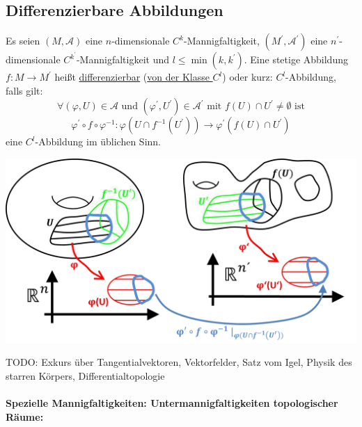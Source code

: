 \documentclass[a4paper,11pt,notitlepage]{report}
\theoremstyle{definition}
\newenvironment{definition}[1]{
	\begin{definitions}
	\marginnote{\emph{#1}}
}{\end{definitions}}
\begin{document}
\subsection{Differenzierbare Abbildungen}
\begin{definition}{$C^l$-Abbildung}
Es seien $(M, \mathcal{A})$ eine $n$-dimensionale $C^k$-Mannigfaltigkeit, $(M^\prime, \mathcal{A}^\prime)$ eine $n^\prime$-dimensionale $C^{k^\prime}$-Mannigfaltigkeit und $l \leq \min(k,k^\prime)$. Eine stetige Abbildung $f \colon M \rightarrow M^\prime$ heißt \underline{differenzierbar} (\underline{von der Klasse $C^l$}) oder kurz: $C^l$-Abbildung, falls gilt:
$$\forall (\varphi,U) \in \mathcal{A} \text{ und } (\varphi^\prime, U^\prime) \in \mathcal{A}^\prime \text{ mit } f(U) \cap U^\prime \neq \emptyset \text{ ist}$$
$$\boxed{\varphi^\prime \circ f \circ \varphi^{-1} \colon \varphi(U \cap f^{-1}(U^\prime)) \rightarrow \varphi^\prime(f(U)\cap U^\prime)}$$
eine $C^l$-Abbildung im üblichen Sinn.
\begin{center}
	\includegraphics[scale=0.4]{images/Abb_diffbar.png}
\end{center}
\end{definition}

TODO: Exkurs über Tangentialvektoren, Vektorfelder, Satz vom Igel, Physik des starren Körpers, Differentialtopologie

\newpage 
\paragraph{
Spezielle Mannigfaltigkeiten: Untermannigfaltigkeiten topologischer Räume: }
 
\end{document}
